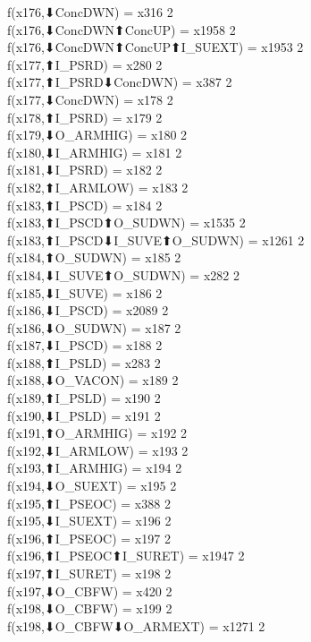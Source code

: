 f(x176,⬇ConcDWN) = x316 {2} \\
f(x176,⬇ConcDWN⬆ConcUP) = x1958 {2} \\
f(x176,⬇ConcDWN⬆ConcUP⬆I_SUEXT) = x1953 {2} \\
f(x177,⬆I_PSRD) = x280 {2} \\
f(x177,⬆I_PSRD⬇ConcDWN) = x387 {2} \\
f(x177,⬇ConcDWN) = x178 {2} \\
f(x178,⬆I_PSRD) = x179 {2} \\
f(x179,⬇O_ARMHIG) = x180 {2} \\
f(x180,⬇I_ARMHIG) = x181 {2} \\
f(x181,⬇I_PSRD) = x182 {2} \\
f(x182,⬆I_ARMLOW) = x183 {2} \\
f(x183,⬆I_PSCD) = x184 {2} \\
f(x183,⬆I_PSCD⬆O_SUDWN) = x1535 {2} \\
f(x183,⬆I_PSCD⬇I_SUVE⬆O_SUDWN) = x1261 {2} \\
f(x184,⬆O_SUDWN) = x185 {2} \\
f(x184,⬇I_SUVE⬆O_SUDWN) = x282 {2} \\
f(x185,⬇I_SUVE) = x186 {2} \\
f(x186,⬇I_PSCD) = x2089 {2} \\
f(x186,⬇O_SUDWN) = x187 {2} \\
f(x187,⬇I_PSCD) = x188 {2} \\
f(x188,⬆I_PSLD) = x283 {2} \\
f(x188,⬇O_VACON) = x189 {2} \\
f(x189,⬆I_PSLD) = x190 {2} \\
f(x190,⬇I_PSLD) = x191 {2} \\
f(x191,⬆O_ARMHIG) = x192 {2} \\
f(x192,⬇I_ARMLOW) = x193 {2} \\
f(x193,⬆I_ARMHIG) = x194 {2} \\
f(x194,⬇O_SUEXT) = x195 {2} \\
f(x195,⬆I_PSEOC) = x388 {2} \\
f(x195,⬇I_SUEXT) = x196 {2} \\
f(x196,⬆I_PSEOC) = x197 {2} \\
f(x196,⬆I_PSEOC⬆I_SURET) = x1947 {2} \\
f(x197,⬆I_SURET) = x198 {2} \\
f(x197,⬇O_CBFW) = x420 {2} \\
f(x198,⬇O_CBFW) = x199 {2} \\
f(x198,⬇O_CBFW⬇O_ARMEXT) = x1271 {2} \\
